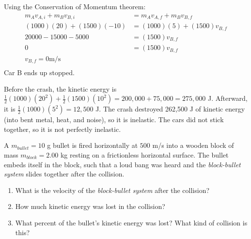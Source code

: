 \begin{Answer}[ref={car_crash}]
Using the Conservation of Momentum theorem:
\begin{align*}
m_A v_{A,i} + m_B v_{B,i}&= m_A v_{A,f} + m_B v_{B,f} \\ 
(1000)(20) + (1500)(-10)&= (1000)(5) + (1500)v_{B,f} \\
20000 -15000 - 5000&= (1500)v_{B,f} \\
0&= (1500)v_{B,f} \\
v_{B,f} = 0 \text {m/s}\\
\end{align*}
Car B ends up stopped.

Before the crash, the kinetic energy is
$\frac{1}{2}(1000)(20^2) + \frac{1}{2}(1500)(10^2) = 200{,}000 + 75{,}000 = 275{,}000$ J.
Afterward, it is $\frac{1}{2}(1000)(5^2) = 12{,}500$ J. The crash
destroyed 262,500 J of kinetic energy (into bent metal, heat, and noise),
so it is inelastic. The cars did not stick together, so it is not
perfectly inelastic.
\end{Answer}

\begin{Exercise}[title={Ready, Aim, Fire!}, label=bullet_in_wood]
A $m_{bullet}=10$ g bullet is fired horizontally at $500$ m/s into a wooden block of mass $m_{block}=2.00$ kg resting on a frictionless horizontal surface. The bullet embeds itself in the block, such that a loud bang was heard and the \emph{block-bullet system} slides together after the collision.

\begin{enumerate}[label=(\alph*)]
  \item What is the velocity of the \emph{block-bullet system} after the collision?
  \item How much kinetic energy was lost in the collision?
  \item What percent of the bullet's kinetic energy was lost? What kind of
        collision is this?
\end{enumerate}
\end{Exercise}

